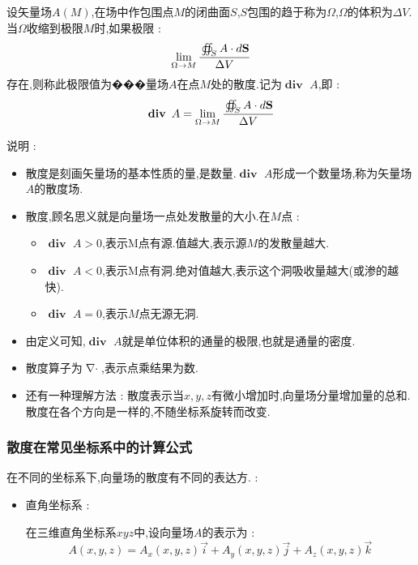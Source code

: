 \documentclass[UTF8,12pt]{ctexbook}
\newcommand{\limNormal}[1]{\lim\limits_{#1}}
\newcommand{\doubleCurveIntegralOnZone}[1]{\oiint_{#1}}
\DeclareMathOperator{\divergenceText}{\mathbf{div}\ }
\DeclareMathOperator{\divergenceSymbol}{\nabla\cdot}
\begin{document}
{{{{{      设矢量场$A(M)$,在场中作包围点$M$的闭曲面$S$,$S$包围的趋于称为$\Omega$,$\Omega$的体积为$\Delta V$.当$\Omega$收缩到极限$M$时,如果极限 :
      $$
        \limNormal{\Omega \to M}\cfrac{\doubleCurveIntegralOnZone{S}A \cdot d\mathbf{S}}{\Delta V}
      $$
      存在,则称此极限值为���量场$A$在点$M$处的散度.记为$\divergenceText A$,即 :
      $$
        \divergenceText A = \limNormal{\Omega \to M}\cfrac{\doubleCurveIntegralOnZone{S}A \cdot d\mathbf{S}}{\Delta V}
      $$

      说明 :
      \begin{itemize}
        \item {
              散度是刻画矢量场的基本性质的量,是数量.$\divergenceText A$形成一个数量场,称为矢量场$A$的散度场.
              }
        \item {
              散度,顾名思义就是向量场一点处发散量的大小.在$M$点 :
              \begin{itemize}
                \item $\divergenceText A > 0$,表示M点有源.值越大,表示源$M$的发散量越大.
                \item $\divergenceText A < 0$,表示M点有洞.绝对值越大,表示这个洞吸收量越大(或渗的越快).
                \item $\divergenceText A = 0$,表示$M$点无源无洞.
              \end{itemize}
              }
        \item {
              由定义可知,$\divergenceText A$就是单位体积的通量的极限,也就是通量的密度.
              }
        \item {
              散度算子为$\divergenceSymbol$,表示点乘结果为数.
              }
        \item {
              还有一种理解方法 : 散度表示当$x,y,z$有微小增加时,向量场分量增加量的总和.散度在各个方向是一样的,不随坐标系旋转而改变.
              }
      \end{itemize}
    }%

    \subsubsection{散度在常见坐标系中的计算公式}{
      在不同的坐标系下,向量场的散度有不同的表达方. :
      \begin{itemize}
        \item {
              直角坐标系 :

              在三维直角坐标系$xyz$中,设向量场$A$的表示为 :
              $$
                A(x,y,z) = A_x(x,y,z)\vec{i} + A_y(x,y,z)\vec{j} + A_z(x,y,z)\vec{k}
              $$

}
\end{itemize}}}}}}
\end{document}

